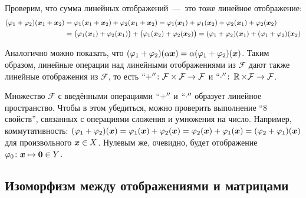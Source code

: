 \documentclass[a4paper,12pt]{article}
\begin{document}
  Проверим, что сумма линейных отображений~---~это тоже линейное отображение:
  \begin{equation*}
  \begin{split}
    (\varphi_1 + \varphi_2) (\boldsymbol x_1 + \boldsymbol x_2)
    &= \varphi_1 (\boldsymbol x_1 + \boldsymbol x_2) + \varphi_2 (\boldsymbol x_1 + \boldsymbol x_2)
    = \varphi_1 (\boldsymbol x_1) + \varphi_1 (\boldsymbol x_2) + \varphi_2 (\boldsymbol x_1) + \varphi_2 (\boldsymbol x_2) \\
    &= \bigl(\varphi_1(\boldsymbol x_1) + \varphi_2(\boldsymbol x_1)\bigr) + \bigl(\varphi_1(\boldsymbol x_2) + \varphi_2(\boldsymbol x_2)\bigr)
    = (\varphi_1 + \varphi_2) (\boldsymbol x_1) + (\varphi_1 + \varphi_2) (\boldsymbol x_2)
  \end{split}
  \end{equation*}
  
  Аналогично можно показать, что $(\phi_1 \hm+ \phi_2) (\alpha \bds x) \hm= \alpha (\phi_1 \hm+ \phi_2) (\bds x)$.
  Таким образом, линейные операции над линейными отображениями из $\mathcal F$ дают также линейные отображения из $\mathcal F$,
  то есть $``{+}''\colon \mathcal F \hm\times \mathcal F \hm\to \mathcal F$ и $``{\cdot}'' \colon \RR \hm\times \mathcal F \hm\to \mathcal F$.
  
  Множество $\mathcal F$ с введёнными операциями $``{+}''$ и $``{\cdot}''$ образует линейное пространство.
  Чтобы в этом убедиться, можно проверить выполнение ``$8$ свойств'', связанных с операциями сложения и умножения на число.
  Например, коммутативность: $(\phi_1 \hm+ \phi_2)(\bds x) \hm= \phi_1(\bds x) \hm+ \phi_2(\bds x) \hm= \phi_2(\bds x) \hm+ \phi_1(\bds x) \hm= (\phi_2 \hm+ \phi_1)(\bds x)$ для произвольного $\bds x \hm\in X$.
  Нулевым же, очевидно, будет отображение $\phi_0\colon \bds x \hm\mapsto \bds 0 \hm\in Y$.
  
  
  \subsection{Изоморфизм между отображениями и матрицами}
  \label{sec:iso}
  
\end{document}
